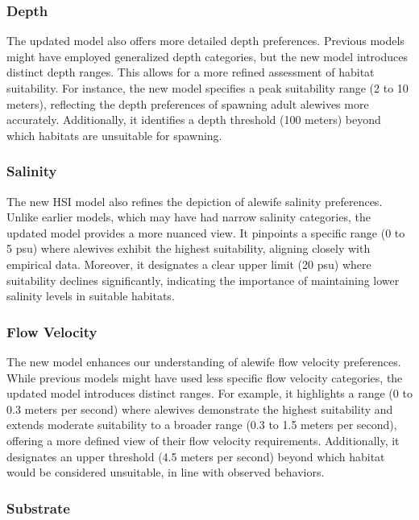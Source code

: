 \documentclass[
]{book}
\begin{document}
\hypertarget{depth-3}{%
\subsubsection{Depth}\label{depth-3}}

The updated model also offers more detailed depth preferences.
Previous models might have employed generalized depth categories, but the new model introduces distinct depth ranges.
This allows for a more refined assessment of habitat suitability.
For instance, the new model specifies a peak suitability range (2 to 10 meters), reflecting the depth preferences of spawning adult alewives more accurately.
Additionally, it identifies a depth threshold (100 meters) beyond which habitats are unsuitable for spawning.

\hypertarget{salinity-3}{%
\subsubsection{Salinity}\label{salinity-3}}

The new HSI model also refines the depiction of alewife salinity preferences.
Unlike earlier models, which may have had narrow salinity categories, the updated model provides a more nuanced view.
It pinpoints a specific range (0 to 5 psu) where alewives exhibit the highest suitability, aligning closely with empirical data.
Moreover, it designates a clear upper limit (20 psu) where suitability declines significantly, indicating the importance of maintaining lower salinity levels in suitable habitats.

\hypertarget{flow-velocity-3}{%
\subsubsection{Flow Velocity}\label{flow-velocity-3}}

The new model enhances our understanding of alewife flow velocity preferences.
While previous models might have used less specific flow velocity categories, the updated model introduces distinct ranges.
For example, it highlights a range (0 to 0.3 meters per second) where alewives demonstrate the highest suitability and extends moderate suitability to a broader range (0.3 to 1.5 meters per second), offering a more defined view of their flow velocity requirements.
Additionally, it designates an upper threshold (4.5 meters per second) beyond which habitat would be considered unsuitable, in line with observed behaviors.

\hypertarget{substrate-3}{%
\subsubsection{Substrate}\label{substrate-3}}
\end{document}
